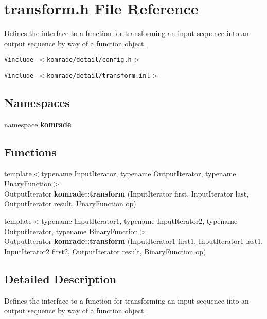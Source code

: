 \section{transform.h File Reference}
\label{transform_8h}
Defines the interface to a function for transforming an input sequence into an output sequence by way of a function object. 

{\tt \#include $<$komrade/detail/config.h$>$}\par
{\tt \#include $<$komrade/detail/transform.inl$>$}\par
\subsection*{Namespaces}
\begin{CompactItemize}
\item 
namespace {\bf komrade}
\end{CompactItemize}
\subsection*{Functions}
\begin{CompactItemize}
\item 
{\footnotesize template$<$typename InputIterator, typename OutputIterator, typename UnaryFunction$>$ }\\OutputIterator {\bf komrade::transform} (InputIterator first, InputIterator last, OutputIterator result, UnaryFunction op)
\item 
{\footnotesize template$<$typename InputIterator1, typename InputIterator2, typename OutputIterator, typename BinaryFunction$>$ }\\OutputIterator {\bf komrade::transform} (InputIterator1 first1, InputIterator1 last1, InputIterator2 first2, OutputIterator result, BinaryFunction op)
\end{CompactItemize}


\subsection{Detailed Description}
Defines the interface to a function for transforming an input sequence into an output sequence by way of a function object. 

